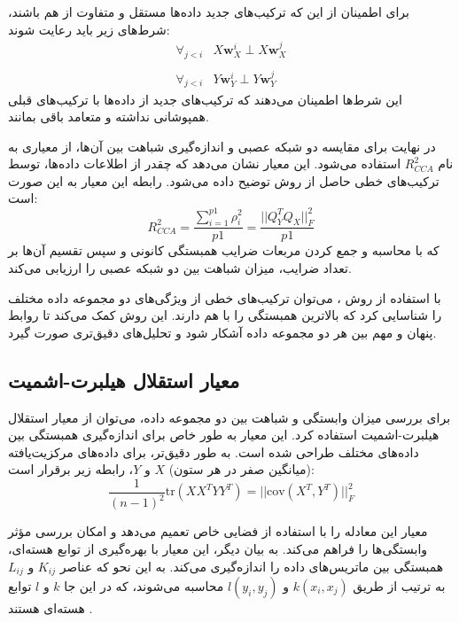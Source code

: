 برای اطمینان از این که ترکیب‌های جدید داده‌ها مستقل و متفاوت از هم باشند، شرط‌های زیر باید رعایت شوند:
\begin{equation}
	\begin{array}{ll}
		\forall_{j<i} & X \mathbf{w}_X^i \perp X \mathbf{w}_X^j
		\\
		\\
		\forall_{j<i} & Y \mathbf{w}_Y^i \perp Y \mathbf{w}_Y^j
	\end{array}
\end{equation}
این شرط‌ها اطمینان می‌دهند که ترکیب‌های جدید از داده‌ها با ترکیب‌های قبلی همپوشانی نداشته و متعامد باقی بمانند.

در نهایت برای مقایسه دو شبکه عصبی و اندازه‌گیری شباهت بین آن‌ها، از معیاری به نام \( R^2_{CCA} \) استفاده می‌شود. این معیار نشان می‌دهد که چقدر از اطلاعات داده‌ها، توسط ترکیب‌های خطی حاصل از روش
توضیح داده می‌شود. رابطه این معیار به این صورت است:
\begin{equation}
	R^2_{CCA} = \frac{\sum_{i=1}^{p1} \rho^2_i}{p1} = \frac{||Q^T_Y Q_X||^2_F}{p1}
	\label{eq_CCA}
\end{equation}
که با محاسبه و جمع کردن مربعات ضرایب همبستگی کانونی و سپس تقسیم آن‌ها بر تعداد ضرایب، میزان شباهت بین دو شبکه عصبی را ارزیابی می‌کند.

با استفاده از روش
%
، می‌توان ترکیب‌های خطی از ویژگی‌های دو مجموعه داده مختلف را شناسایی کرد که بالاترین همبستگی را با هم دارند. این روش کمک می‌کند تا روابط پنهان و مهم بین هر دو مجموعه داده آشکار شود و تحلیل‌های دقیق‌تری صورت گیرد.







\subsection{
	معیار استقلال هیلبرت-اشمیت%
	}
برای بررسی میزان وابستگی و شباهت بین دو مجموعه داده، می‌توان از معیار استقلال هیلبرت-اشمیت استفاده کرد. این معیار به طور خاص برای اندازه‌گیری همبستگی بین داده‌های مختلف طراحی شده است. به طور دقیق‌تر، برای داده‌های مرکزیت‌یافته (میانگین صفر در هر ستون) \(X\) و \(Y\)، رابطه زیر برقرار است:
\begin{equation}
	\frac{1}{(n - 1)^2} \text{tr}(XX^TYY^T) = ||\text{cov}(X^T, Y^T)||_F^2
\end{equation}

معیار
این معادله را با استفاده از فضایی خاص تعمیم می‌دهد و امکان بررسی مؤثر وابستگی‌ها را فراهم می‌کند. به بیان دیگر، این معیار با بهره‌گیری از توابع هسته‌ای، همبستگی بین ماتریس‌های داده را اندازه‌گیری می‌کند. به این نحو که عناصر \(K_{ij}\) و \(L_{ij}\) به ترتیب از طریق \(k(x_i, x_j)\) و \(l(y_i, y_j)\) محاسبه می‌شوند، که در این جا \(k\) و \(l\) توابع هسته‌ای هستند
\cite{gretton2005measuring}.

